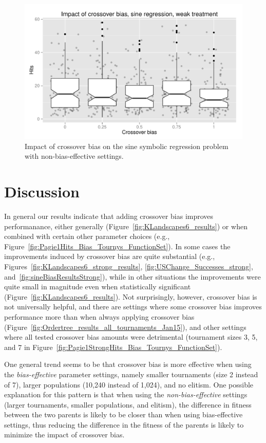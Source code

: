 \documentclass{sig-alternate}
\begin{document}
\begin{figure}
\centering
\includegraphics[width=0.45 \textwidth]{Plots/Sine_XO_impact_weak_boxplot.pdf}
\caption{Impact of crossover bias on the sine symbolic regression problem with non-bias-effective settings.}
\label{fig:sineBiasResultsWeak}
\end{figure}

\section{Discussion} \label{sec:Discussion}

In general our results indicate that adding crossover bias improves performanance, either generally
(Figure~\ref{fig:KLandscapes6_results}) or when combined with certain other parameter choices (e.g.,
Figure~\ref{fig:Pagie1Hits_Bias_Tournys_FunctionSet}). In some cases the improvements induced by crossover bias are
quite substantial (e.g., Figures~\ref{fig:KLandscapes6_strong_results}, \ref{fig:USChange_Successes_strong},
and~\ref{fig:sineBiasResultsStrong}), while in other situations the improvements were quite small in magnitude even
when statistically significant (Figure~\ref{fig:KLandscapes6_results}). Not surprisingly, however, crossover bias is
not universally helpful, and there are settings where some crossover bias improves performance more than when always
applying crossover bias (Figure~\ref{fig:Ordertree_results_all_tournaments_Jan15}), and other settings where all tested
crossover bias amounts were detrimental (tournament sizes 3, 5, and 7 in
Figure~\ref{fig:Pagie1StrongHits_Bias_Tournys_FunctionSet}).

One general trend seems to be that crossover bias is more effective when using the \emph{bias-effective} parameter
settings, namely smaller tournaments (size 2 instead of 7), larger populations (10,240 instead of 1,024), and no
elitism. One possible explanation for this pattern is that when using the \emph{non-bias-effective} settings (larger
tournaments, smaller populations, and elitism), the difference in fitness between the two parents is likely to be
closer than when using bias-effective settings, thus reducing the difference in the fitness of the parents is likely to
minimize the impact of crossover bias.
\end{document}

